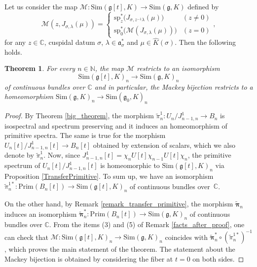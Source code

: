 \documentclass{amsart}
\newtheorem{theorem}{Theorem}[section]
\theoremstyle{definition}
\begin{document}
Let us consider the map $\bm{\mathcal{M}} : \mathrm{Sim}(\mathfrak{g}[t],K) \to \mathrm{Sim}(\bm{\mathfrak{g}},K)$ defined by
\[\bm{\mathcal{M}}(z, J_{\sigma,\lambda}(\mu)) = \begin{cases}
         \mathrm{sp}_z^*\big(J_{\sigma,z^{-1}\lambda}(\mu)\big) & (z\neq 0)\\
         \mathrm{sp}_0^*\big(\mathcal{M}(J_{\sigma,\lambda}(\mu))\big) & (z=0)
     \end{cases},
 \]
for any $z \in \mathbb{C}$, cuspidal datum $\sigma$, $\lambda \in \mathfrak{a}^*_\sigma$ and $\mu \in \widehat{K}(\sigma)$. Then the following holds.

\begin{theorem}
    For every $n \in \mathbb{N}$, the map $\bm{\mathcal{M}}$ restricts to an isomorphism $$\mathrm{Sim}(\mathfrak{g}[t],K)_n \to \mathrm{Sim}(\bm{\mathfrak{g}},K)_n$$ of continuous bundles over $\mathbb{C}$ and in particular, the Mackey bijection restricts to a homeomorphism $\mathrm{Sim}(\mathfrak{g},K)_n \to \mathrm{Sim}(\mathfrak{g}_0,K)_n$
\end{theorem}

\begin{proof}
    By Theorem \ref{big_theorem}, the morphism $\tilde{\pi}^1_n : U_{n}/J^1_{n-1,n} \to B_n$ is isospectral and spectrum preserving and it induces an homeomorphism of primitive spectra. The same is true for the morphism $U_{n}[t]/J^1_{n-1,n}[t] \to B_n[t]$ obtained by extension of scalars, which we also denote by $\tilde{\pi}^1_n$. Now, since $J^1_{n-1,n}[t] = \chi_n U[t]\chi_{n-1} U[t]\chi_n$,
    the primitive spectrum of $U_n[t]/J^1_{n-1,n}[t]$ is homeomorphic to $\mathrm{Sim}(\mathfrak{g}[t],K)_n$ via Proposition \ref{TransferPrimitive}. To sum up, we have an isomorphism $\tilde{\pi}^{1*}_n : \mathrm{Prim}(B_{n}[t]) \to \mathrm{Sim}(\mathfrak{g}[t],K)_n$ of continuous bundles over~$\mathbb{C}$.
    
    On the other hand, by Remark \ref{remark_transfer_primitive}, the morphism $\tilde{\bm{\pi}}_n$ induces an isomorphism $\tilde{\bm{\pi}}_n^* : \mathrm{Prim}(B_{n}[t]) \to \mathrm{Sim}(\bm{\mathfrak{g}},K)_n$ of continuous bundles over $\mathbb{C}$. From the items (3) and (5) of Remark \ref{facts_after_proof}, one can check that $\bm{\mathcal{M}} : \mathrm{Sim}(\mathfrak{g}[t],K)_n \to \mathrm{Sim}(\bm{\mathfrak{g}},K)_n$ coincides with $\tilde{\bm{\pi}}_n^* \circ (\tilde{\pi}^{1*}_n)^{-1}$, which proves the main statement of the theorem. The statement about the Mackey bijection is obtained by considering the fiber at $t = 0$ on both sides.
\end{proof}
\end{document}
